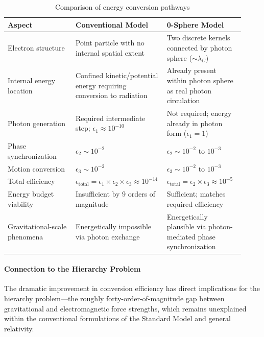 \documentclass[12pt,letterpaper]{article}
\begin{document}
\begin{table}[h!]
\centering
\caption{Comparison of energy conversion pathways}
\label{tab:efficiency_comparison}
\begin{tabular}{p{0.28\linewidth}p{0.32\linewidth}p{0.32\linewidth}}
\toprule
\textbf{Aspect} & \textbf{Conventional Model} & \textbf{0-Sphere Model} \\
\midrule
Electron structure & Point particle with no internal spatial extent & Two discrete kernels connected by photon sphere ($\sim \lambda_C$) \\
\midrule
Internal energy location & Confined kinetic/potential energy requiring conversion to radiation & Already present within photon sphere as real photon circulation \\
\midrule
Photon generation & Required intermediate step; $\epsilon_1 \approx 10^{-10}$ & Not required; energy already in photon form ($\epsilon_1 = 1$) \\
\midrule
Phase synchronization & $\epsilon_2 \sim 10^{-2}$ & $\epsilon_2 \sim 10^{-2}$ to $10^{-3}$ \\
\midrule
Motion conversion & $\epsilon_3 \sim 10^{-2}$ & $\epsilon_3 \sim 10^{-2}$ to $10^{-3}$ \\
\midrule
Total efficiency & $\epsilon_{\text{total}} = \epsilon_1 \times \epsilon_2 \times \epsilon_3 \approx 10^{-14}$ & $\epsilon_{\text{total}} = \epsilon_2 \times \epsilon_3 \approx 10^{-5}$ \\
\midrule
Energy budget viability & Insufficient by 9 orders of magnitude & Sufficient; matches required efficiency \\
\midrule
Gravitational-scale phenomena & Energetically impossible via photon exchange & Energetically plausible via photon-mediated phase synchronization \\
\bottomrule
\end{tabular}
\end{table}

\paragraph{Connection to the Hierarchy Problem}

The dramatic improvement in conversion efficiency has direct implications for the hierarchy problem—the roughly forty-order-of-magnitude gap between gravitational and electromagnetic force strengths, which remains unexplained within the conventional formulations of the Standard Model and general relativity.
\end{document}
